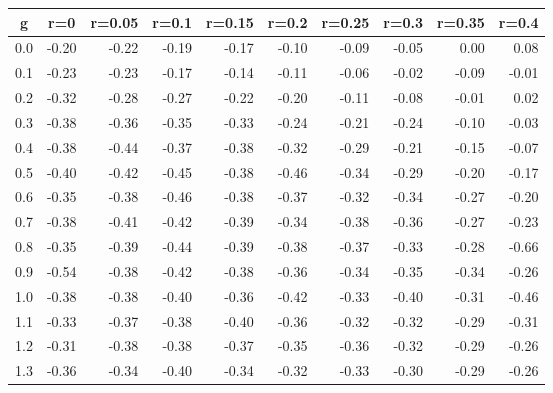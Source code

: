 %
\begin{table}[!tbp]
 \begin{center}
 \begin{tabular}{rrrrrrrrrr}\hline\hline
\multicolumn{1}{c}{g}&\multicolumn{1}{c}{r=0}&\multicolumn{1}{c}{r=0.05}&\multicolumn{1}{c}{r=0.1}&\multicolumn{1}{c}{r=0.15}&\multicolumn{1}{c}{r=0.2}&\multicolumn{1}{c}{r=0.25}&\multicolumn{1}{c}{r=0.3}&\multicolumn{1}{c}{r=0.35}&\multicolumn{1}{c}{r=0.4}\tabularnewline
\hline
0.0&-0.20&-0.22&-0.19&-0.17&-0.10&-0.09&-0.05& 0.00& 0.08\tabularnewline
0.1&-0.23&-0.23&-0.17&-0.14&-0.11&-0.06&-0.02&-0.09&-0.01\tabularnewline
0.2&-0.32&-0.28&-0.27&-0.22&-0.20&-0.11&-0.08&-0.01& 0.02\tabularnewline
0.3&-0.38&-0.36&-0.35&-0.33&-0.24&-0.21&-0.24&-0.10&-0.03\tabularnewline
0.4&-0.38&-0.44&-0.37&-0.38&-0.32&-0.29&-0.21&-0.15&-0.07\tabularnewline
0.5&-0.40&-0.42&-0.45&-0.38&-0.46&-0.34&-0.29&-0.20&-0.17\tabularnewline
0.6&-0.35&-0.38&-0.46&-0.38&-0.37&-0.32&-0.34&-0.27&-0.20\tabularnewline
0.7&-0.38&-0.41&-0.42&-0.39&-0.34&-0.38&-0.36&-0.27&-0.23\tabularnewline
0.8&-0.35&-0.39&-0.44&-0.39&-0.38&-0.37&-0.33&-0.28&-0.66\tabularnewline
0.9&-0.54&-0.38&-0.42&-0.38&-0.36&-0.34&-0.35&-0.34&-0.26\tabularnewline
1.0&-0.38&-0.38&-0.40&-0.36&-0.42&-0.33&-0.40&-0.31&-0.46\tabularnewline
1.1&-0.33&-0.37&-0.38&-0.40&-0.36&-0.32&-0.32&-0.29&-0.31\tabularnewline
1.2&-0.31&-0.38&-0.38&-0.37&-0.35&-0.36&-0.32&-0.29&-0.26\tabularnewline
1.3&-0.36&-0.34&-0.40&-0.34&-0.32&-0.33&-0.30&-0.29&-0.26\tabularnewline
\hline
\end{tabular}

\end{center}

\end{table}

